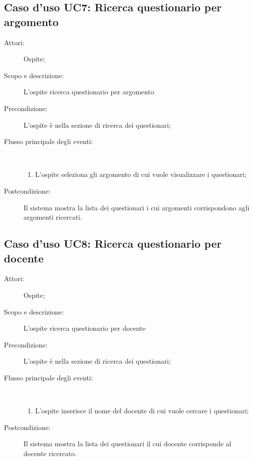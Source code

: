\subsection{Caso d'uso UC7: Ricerca questionario per argomento}\begin{description}
	\item[Attori:] Ospite;
	\item[Scopo e descrizione:] L'ospite ricerca questionario per argomento
	\item[Precondizione:] L'ospite è nella sezione di ricerca dei questionari;
	
	\item[Flusso principale degli eventi:] \ 
	\begin{enumerate}
		\item L'ospite seleziona gli argomento di cui vuole visualizzare i questionari;
		
	\end{enumerate}
	\item[Postcondizione:] Il sistema mostra la lista dei questionari i cui argomenti corrispondono agli argomenti ricercati.
\end{description}
\hypertarget{UC8}{}
\subsection{Caso d'uso UC8: Ricerca questionario per docente}\begin{description}
	\item[Attori:] Ospite;
	\item[Scopo e descrizione:] L'ospite ricerca questionario per docente
	\item[Precondizione:] L'ospite è nella sezione di ricerca dei questionari;
	
	\item[Flusso principale degli eventi:] \ 
	\begin{enumerate}
		\item L'ospite inserisce il nome del docente di cui vuole cercare i questionari;
		
	\end{enumerate}
	\item[Postcondizione:] Il sistema mostra la lista dei questionari il cui docente corrisponde al docente ricercato.
\end{description}
\hypertarget{UC9}{}
